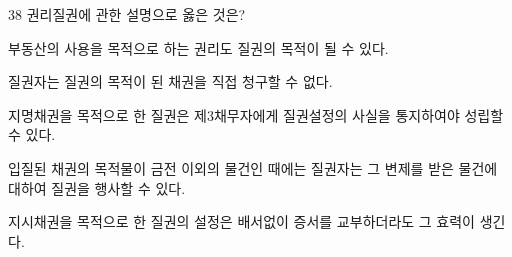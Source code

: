 \begin{question}{38}
권리질권에 관한 설명으로 옳은 것은?
\begin{choices}
  \item 부동산의 사용을 목적으로 하는 권리도 질권의 목적이 될 수 있다.
  \item 질권자는 질권의 목적이 된 채권을 직접 청구할 수 없다.
  \item 지명채권을 목적으로 한 질권은 제3채무자에게 질권설정의 사실을 통지하여야 성립할 수 있다.
  \item 입질된 채권의 목적물이 금전 이외의 물건인 때에는 질권자는 그 변제를 받은 물건에 대하여 질권을 행사할 수 있다.
  \item 지시채권을 목적으로 한 질권의 설정은 배서없이 증서를 교부하더라도 그 효력이 생긴다.
\end{choices}
\end{question}
